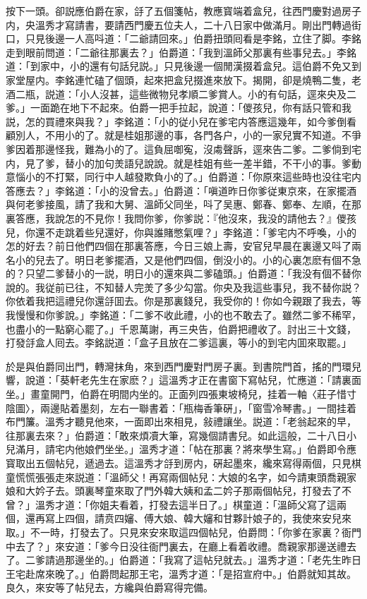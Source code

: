 按下一頭。卻説應伯爵在家，㧱了五個箋帖，教應寳端着盒兒，往西門慶對過房子内，央溫秀才寫請書，要請西門慶五位夫人，二十八日家中做滿月。剛出門轉過街口，只見後邊一人高呌道：「二爺請回來。」伯爵扭頭囘看是李銘，立住了脚。李銘走到眼前問道：「二爺往那裏去？」伯爵道：「我到溫師父那裏有些事兒去。」李銘道：「到家中，小的還有句話兒説。」只見後邊一個閒漢掇着盒兒。這伯爵不免又到家堂屋内。李銘連忙磕了個頭，起來把盒兒掇進來放下。揭開，卻是燒鴨二隻，老酒二瓶，説道：「小人沒甚，這些微物兒孝順二爹賞人。小的有句話，逕來央及二爹。」一面跪在地下不起來。伯爵一把手拉起，說道：「儍孩兒，你有話只管和我説，怎的買禮來與我？」李銘道：「小的従小兒在爹宅内答應這幾年，如今爹倒看顧別人，不用小的了。就是桂姐那邊的事，各門各户，小的一家兒實不知道。不爭爹因着那邊怪我，難為小的了。這負屈啣寃，沒䖏聲訴，逕來告二爹。二爹倘到宅内，見了爹，替小的加句羙語兒說說。就是桂姐有些一差半錯，不干小的事。爹動意惱小的不打緊，同行中人越發欺負小的了。」伯爵道：「你原來這些時也没往宅内答應去？」李銘道：「小的没曾去。」伯爵道：「嗔道昨日你爹従東京來，在家擺酒與何老爹接風，請了我和大舅、溫師父同坐，呌了吴惠、鄭春、鄭奉、左順，在那裏答應，我說怎的不見你！我問你爹，你爹説：『他沒來，我没的請他去？』儍孩兒，你還不走跳着些兒還好，你與誰賭憋氣哩？」李銘道：「爹宅内不呼喚，小的怎的好去？前日他們四個在那裏答應，今日三娘上壽，安官兒早晨在裏邊又呌了兩名小的兒去了。明日老爹擺酒，又是他們四個，倒没小的。小的心裏怎麽有個不急的？只望二爹替小的一説，明日小的還來與二爹磕頭。」伯爵道：「我没有個不替你說的。我従前已往，不知替人完羙了多少勾當。你央及我這些事兒，我不替你説？你依着我把這禮兒你還㧱囬去。你是那裏錢兒，我受你的！你如今親跟了我去，等我慢慢和你爹說。」李銘道：「二爹不收此禮，小的也不敢去了。雖然二爹不稀罕，也盡小的一點窮心罷了。」千恩萬謝，再三央告，伯爵把禮收了。討出三十文錢，打發㧱盒人囘去。李銘説道：「盒子且放在二爹這裏，等小的到宅内囬來取罷。」

於是與伯爵同出門，轉灣抹角，來到西門慶對門房子裏。到書院門首，搖的門環兒響，說道：「葵軒老先生在家麽？」這溫秀才正在書窗下寫帖兒，忙應道：「請裏面坐。」畫童開門，伯爵在明間内坐的。正面列四張東坡椅兒，挂着一軸〈莊子惜寸陰圖〉，兩邊貼着墨刻，左右一聯書着：「瓶梅香筆硏」，「窗雪冷琴書。」一間挂着布門簾。溫秀才聽見他來，一面即出來相見，敍禮讓坐。説道：「老翁起來的早，往那裏去來？」伯爵道：「敢來煩凟大筆，寫幾個請書兒。如此這般，二十八日小兒滿月，請宅内他娘們坐坐。」溫秀才道：「帖在那裏？將來學生寫。」伯爵即令應寳取出五個帖兒，遞過去。這溫秀才㧱到房内，硏起墨來，纔來寫得兩個，只見棋童慌慌張張走來説道：「溫師父！再寫兩個帖兒：大娘的名字，如今請東頭喬親家娘和大妗子去。頭裏琴童來取了門外韓大姨和孟二妗子那兩個帖兒，打發去了不曾？」溫秀才道：「你姐夫看着，打發去這半日了。」棋童道：「溫師父寫了這兩個，還再寫上四個，請贲四嬸、傅大娘、韓大嬸和甘夥計娘子的，我使來安兒來取。」不一時，打發去了。只見來安來取這四個帖兒，伯爵問：「你爹在家裏？衙門中去了？」來安道：「爹今日没往衙門裏去，在廳上看着收禮。喬親家那邊送禮去了。二爹請過那邊坐的。」伯爵道：「我寫了這帖兒就去。」溫秀才道：「老先生昨日王宅赴席來晚了。」伯爵問起那王宅，溫秀才道：「是招宣府中。」伯爵就知其故。良久，來安等了帖兒去，方纔與伯爵寫得完備。

